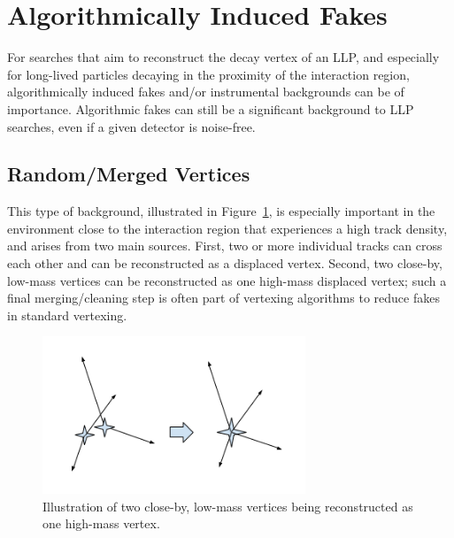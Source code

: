 \section{Algorithmically Induced Fakes} %

For searches that aim to reconstruct the decay vertex of an LLP, and especially for long-lived particles decaying in the proximity of the interaction region, algorithmically induced fakes and/or instrumental backgrounds can be of importance. Algorithmic fakes can still be a significant background to LLP searches, even if a given detector is noise-free.

\subsection{Random/Merged Vertices} %

This type of background, illustrated in Figure~\ref{fig:mergedvertices}, is especially important in the environment close to the interaction region that experiences a high track density, and arises from two main sources. First, two or more individual tracks can cross each other and can be reconstructed as a displaced vertex. Second, two close-by, low-mass vertices can be reconstructed as one high-mass displaced vertex; such a final merging/cleaning step is often part of vertexing algorithms to reduce fakes in standard vertexing.

\begin{figure}[h]
  \centering
  \includegraphics[width=0.7\textwidth]{figures/mergedvertices.png}
  \caption{Illustration of two close-by, low-mass vertices being reconstructed as one high-mass vertex.}
  \label{fig:mergedvertices}
\end{figure}

